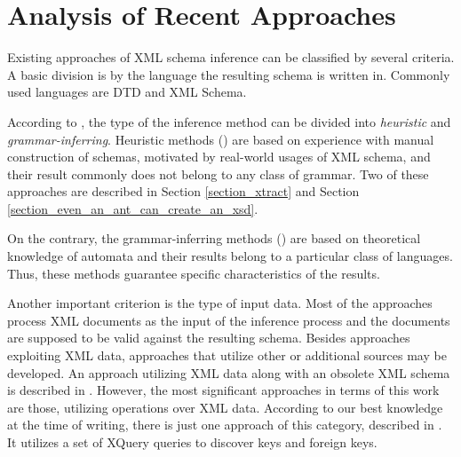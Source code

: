 \chapter{Analysis of Recent Approaches} \label{chapter_analysis_of_recent_approaches}
Existing approaches of XML schema inference can be classified by several criteria. A basic division is by the language the resulting schema is written in. Commonly used languages are DTD and XML Schema.

According to \cite{Mlynkova:2008:AAX:1494650.1495496}, the type of the inference method can be divided into \emph{heuristic} and \emph{grammar-inferring}. Heuristic methods (\cite{Chidlovskii:2002:SEX:544220.544288, Garofalakis:2000:XSE:342009.335409, Moh:2000:RSW:336597.336638, Wong03onstructural, Vosta:2008:EAC:1802514.1802522}) are based on experience with manual construction of schemas, motivated by real-world usages of XML schema, and their result commonly does not belong to any class of grammar. Two of these approaches are described in Section \ref{section_xtract} and Section \ref{section_even_an_ant_can_create_an_xsd}.

On the contrary, the grammar-inferring methods (\cite{Ahonen1996GeneratingGrammars, Bex:2006:ICD:1182635.1164139, Bex:2007:IXS:1325851.1325964, Hegewald:2006:XES:1129755.1130124, Min:2003:EES:639473.639475, Fernau:2001:LXG:645744.667236}) are based on theoretical knowledge of automata and their results belong to a particular class of languages. Thus, these methods guarantee specific characteristics of the results.

Another important criterion is the type of input data. Most of the approaches process XML documents as the input of the inference process and the documents are supposed to be valid against the resulting schema. Besides approaches exploiting XML data, approaches that utilize other or additional sources may be developed. An approach utilizing XML data along with an obsolete XML schema is described in \cite{Mlynkova:2009:IXS:1862681.1862693}. However, the most significant approaches in terms of this work are those, utilizing operations over XML data. According to our best knowledge at the time of writing, there is just one approach of this category, described in \cite{Necasky:2009:DXK:1529282.1529414}. It utilizes a set of XQuery queries to discover keys and foreign keys.

